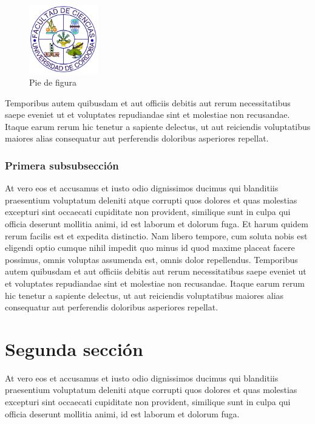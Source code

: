 \begin{figure}[H]
  \centering
  \includegraphics[width=3cm]{logo_ciencias.png}
  \caption{Pie de figura}
  \label{fig:ejemplo1}
\end{figure}

Temporibus autem quibusdam et aut 
officiis debitis aut rerum necessitatibus saepe eveniet ut et voluptates 
repudiandae sint et molestiae non recusandae. Itaque earum rerum hic 
tenetur a sapiente delectus, ut aut reiciendis voluptatibus maiores 
alias consequatur aut perferendis doloribus asperiores repellat.


\subsubsection{Primera subsubsección}

At vero eos et accusamus et iusto odio dignissimos ducimus 
qui blanditiis praesentium voluptatum deleniti atque corrupti 
quos dolores et quas molestias excepturi sint occaecati cupiditate 
non provident, similique sunt in culpa qui officia deserunt mollitia animi, 
id est laborum et dolorum fuga. Et harum quidem rerum facilis est et expedita 
distinctio. Nam libero tempore, cum soluta nobis est eligendi optio cumque 
nihil impedit quo minus id quod maxime placeat facere possimus, omnis voluptas 
assumenda est, omnis dolor repellendus. Temporibus autem quibusdam et aut 
officiis debitis aut rerum necessitatibus saepe eveniet ut et voluptates 
repudiandae sint et molestiae non recusandae. Itaque earum rerum hic 
tenetur a sapiente delectus, ut aut reiciendis voluptatibus maiores 
alias consequatur aut perferendis doloribus asperiores repellat.




\section{Segunda sección}

At vero eos et accusamus et iusto odio dignissimos ducimus 
qui blanditiis praesentium voluptatum deleniti atque corrupti 
quos dolores et quas molestias excepturi sint occaecati cupiditate 
non provident, similique sunt in culpa qui officia deserunt mollitia animi, 
id est laborum et dolorum fuga. 

